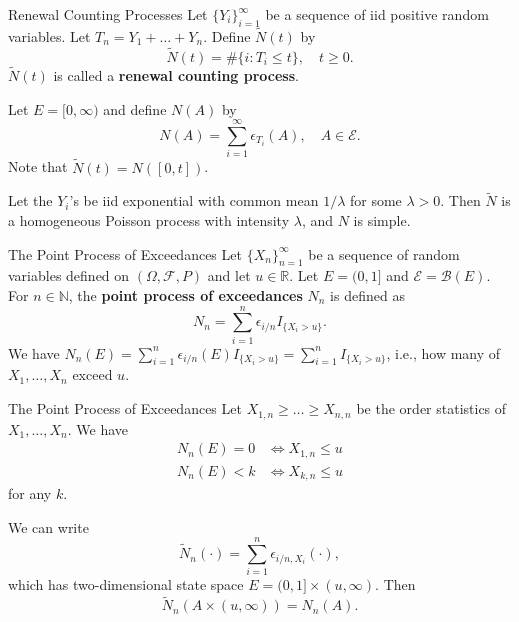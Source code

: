 \documentclass{beamer}
\begin{document}
\begin{frame}{Renewal Counting Processes}
    Let $\{Y_i\}_{i = 1}^{\infty}$ be a sequence of iid positive random variables. Let $T_n = Y_1 + \ldots + Y_n$. Define $\tilde{N}(t)$ by
    \[
    \tilde{N}(t) = \#\{i : T_i \le t\}, \quad t \ge 0.
    \]
    $\tilde{N}(t)$ is called a \textbf{renewal counting process}.

    \smallskip
    
    Let $E = [0, \infty)$ and define $N(A)$ by
    \[
    N(A) = \sum_{i = 1}^{\infty} \epsilon_{T_i}(A), \quad A \in \mathcal{E}.
    \]
    Note that $\tilde{N}(t) = N([0, t])$.

    \smallskip

    Let the $Y_i$'s be iid exponential with common mean $1 / \lambda$ for some $\lambda > 0$. Then $\tilde{N}$ is a homogeneous Poisson process with intensity $\lambda$, and $N$ is simple.
\end{frame}

\begin{frame}{The Point Process of Exceedances}
    Let $\{X_n\}_{n = 1}^{\infty}$ be a sequence of random variables defined on $(\Omega, \mathcal{F}, P)$ and let $u \in \mathbb{R}$. Let $E = (0, 1]$ and $\mathcal{E} = \mathcal{B}(E)$. For $n \in \mathbb{N}$, the \textbf{point process of exceedances} $N_n$ is defined as
    \[
    N_n = \sum_{i = 1}^n \epsilon_{i / n}I_{\{X_i > u\}}.
    \]
    We have $N_n(E) = \sum_{i = 1}^n \epsilon_{i / n}(E)I_{\{X_i > u\}} = \sum_{i = 1}^n I_{\{X_i > u\}}$, i.e., how many of $X_1, \ldots, X_n$ exceed $u$.
\end{frame}

\begin{frame}{The Point Process of Exceedances}
    Let $X_{1, n} \ge \ldots \ge X_{n, n}$ be the order statistics of $X_1, \ldots, X_n$. We have
    \begin{align*}
        N_n(E) = 0 &\iff X_{1, n} \le u \\
        N_n(E) < k &\iff X_{k, n} \le u
    \end{align*}
    for any $k$.

    \smallskip

    We can write
    \[
    \tilde{N}_n(\cdot) = \sum_{i = 1}^n \epsilon_{i / n, X_i}(\cdot),
    \]
    which has two-dimensional state space $E = (0, 1] \times (u, \infty)$. Then
    \[
    \tilde{N}_n(A \times (u, \infty)) = N_n(A).
    \]
\end{frame}
\end{document}
